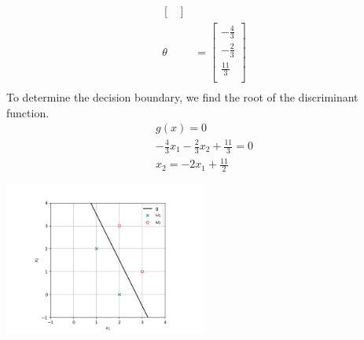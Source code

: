 \documentclass[a4paper, 10pt, twoside]{article}
\begin{document}
\begin{enumerate}[a)]
\begin{align*}
\begin{bmatrix}
              \end{bmatrix} \\
              \theta         & =
              \begin{bmatrix}
                  -\frac{4}{3} \\
                  -\frac{2}{3} \\
                  \frac{11}{3} \\
              \end{bmatrix} \\
          \end{align*}
          To determine the decision boundary, we find the root of the discriminant function.
          \begin{align*}
              g(x) = 0                                              \\
              -\frac{4}{3} x_1 - \frac{2}{3} x_2 + \frac{11}{3} = 0 \\
              x_2 = -2x_1 + \frac{11}{2}
          \end{align*}
          \begin{center}
              \includegraphics[width=0.5\textwidth]{graph2.png}
          \end{center}


\end{enumerate}
\end{document}
